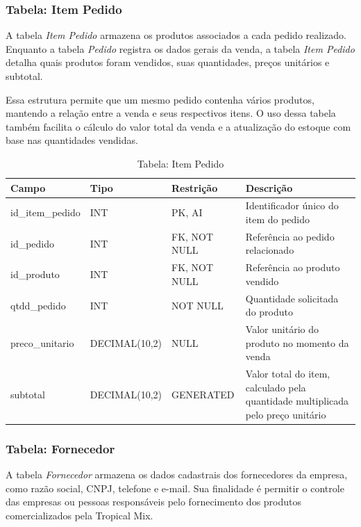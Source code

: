 \subsubsection{Tabela: Item Pedido}

A tabela \textit{Item Pedido} armazena os produtos associados a cada pedido realizado. Enquanto a tabela \textit{Pedido} registra os dados gerais da venda, a tabela \textit{Item Pedido} detalha quais produtos foram vendidos, suas quantidades, preços unitários e subtotal.

Essa estrutura permite que um mesmo pedido contenha vários produtos, mantendo a relação entre a venda e seus respectivos itens. O uso dessa tabela também facilita o cálculo do valor total da venda e a atualização do estoque com base nas quantidades vendidas.

\begin{table}[H]
\centering
\begin{tabular}{|p{3cm}|p{3cm}|p{3cm}|p{5cm}|}
\hline
\textbf{Campo} & \textbf{Tipo} & \textbf{Restrição} & \textbf{Descrição} \\ \hline
id\_item\_pedido & INT & PK, AI & Identificador único do item do pedido \\ \hline
id\_pedido & INT & FK, NOT NULL & Referência ao pedido relacionado \\ \hline
id\_produto & INT & FK, NOT NULL & Referência ao produto vendido \\ \hline
qtdd\_pedido & INT & NOT NULL & Quantidade solicitada do produto \\ \hline
preco\_unitario & DECIMAL(10,2) & NULL & Valor unitário do produto no momento da venda \\ \hline
subtotal & DECIMAL(10,2) & GENERATED & Valor total do item, calculado pela quantidade multiplicada pelo preço unitário \\ \hline
\end{tabular}
\caption{Tabela: Item Pedido}
\end{table}

\subsubsection{Tabela: Fornecedor}

A tabela \textit{Fornecedor} armazena os dados cadastrais dos fornecedores da empresa, como razão social, CNPJ, telefone e e-mail. Sua finalidade é permitir o controle das empresas ou pessoas responsáveis pelo fornecimento dos produtos comercializados pela Tropical Mix.

